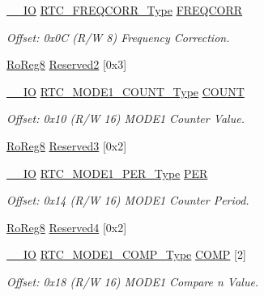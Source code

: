 \begin{DoxyCompactItemize}
\mbox{\hyperlink{core__cm0plus_8h_aec43007d9998a0a0e01faede4133d6be}{\+\_\+\+\_\+\+IO}} \mbox{\hyperlink{union_r_t_c___f_r_e_q_c_o_r_r___type}{R\+T\+C\+\_\+\+F\+R\+E\+Q\+C\+O\+R\+R\+\_\+\+Type}} \mbox{\hyperlink{struct_rtc_mode1_a6895b43aadf5f05e11817146109d789a}{F\+R\+E\+Q\+C\+O\+RR}}
\begin{DoxyCompactList}\small\item\em Offset\+: 0x0C (R/W 8) Frequency Correction. \end{DoxyCompactList}\item 
\mbox{\hyperlink{group___s_a_m_d21_e15_a__definitions_ga0d957f1433aaf5d70e4dc2b68288442d}{Ro\+Reg8}} \mbox{\hyperlink{struct_rtc_mode1_a3e3d4b7e35d84b272d434a1396e8b7be}{Reserved2}} \mbox{[}0x3\mbox{]}
\item 
\mbox{\hyperlink{core__cm0plus_8h_aec43007d9998a0a0e01faede4133d6be}{\+\_\+\+\_\+\+IO}} \mbox{\hyperlink{union_r_t_c___m_o_d_e1___c_o_u_n_t___type}{R\+T\+C\+\_\+\+M\+O\+D\+E1\+\_\+\+C\+O\+U\+N\+T\+\_\+\+Type}} \mbox{\hyperlink{struct_rtc_mode1_a0808842545395ceeb23b965868dd47a5}{C\+O\+U\+NT}}
\begin{DoxyCompactList}\small\item\em Offset\+: 0x10 (R/W 16) M\+O\+D\+E1 Counter Value. \end{DoxyCompactList}\item 
\mbox{\hyperlink{group___s_a_m_d21_e15_a__definitions_ga0d957f1433aaf5d70e4dc2b68288442d}{Ro\+Reg8}} \mbox{\hyperlink{struct_rtc_mode1_ad07c4ef2ff7a794403c53387495e8d6d}{Reserved3}} \mbox{[}0x2\mbox{]}
\item 
\mbox{\hyperlink{core__cm0plus_8h_aec43007d9998a0a0e01faede4133d6be}{\+\_\+\+\_\+\+IO}} \mbox{\hyperlink{union_r_t_c___m_o_d_e1___p_e_r___type}{R\+T\+C\+\_\+\+M\+O\+D\+E1\+\_\+\+P\+E\+R\+\_\+\+Type}} \mbox{\hyperlink{struct_rtc_mode1_a1d92b9cf8b55f7293409f66fb6c251dc}{P\+ER}}
\begin{DoxyCompactList}\small\item\em Offset\+: 0x14 (R/W 16) M\+O\+D\+E1 Counter Period. \end{DoxyCompactList}\item 
\mbox{\hyperlink{group___s_a_m_d21_e15_a__definitions_ga0d957f1433aaf5d70e4dc2b68288442d}{Ro\+Reg8}} \mbox{\hyperlink{struct_rtc_mode1_aec3221203f6f367a8473128fc2f5429e}{Reserved4}} \mbox{[}0x2\mbox{]}
\item 
\mbox{\hyperlink{core__cm0plus_8h_aec43007d9998a0a0e01faede4133d6be}{\+\_\+\+\_\+\+IO}} \mbox{\hyperlink{union_r_t_c___m_o_d_e1___c_o_m_p___type}{R\+T\+C\+\_\+\+M\+O\+D\+E1\+\_\+\+C\+O\+M\+P\+\_\+\+Type}} \mbox{\hyperlink{struct_rtc_mode1_a7b60a62749d701b6a656e845cebad3e7}{C\+O\+MP}} \mbox{[}2\mbox{]}
\begin{DoxyCompactList}\small\item\em Offset\+: 0x18 (R/W 16) M\+O\+D\+E1 Compare n Value. \end{DoxyCompactList}\end{DoxyCompactItemize}


